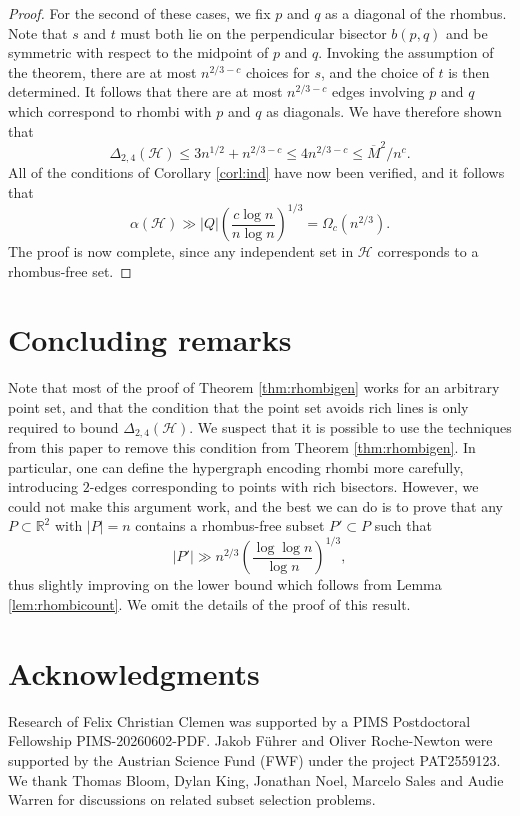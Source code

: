 \documentclass[11pt,oneside]{amsart}
\newcommand{\cH}{\mathcal{H}}
\numberwithin{exercise}{subsection}
\begin{document}
\begin{proof}
For the second of these cases, we fix $p$ and $q$ as a diagonal of the rhombus. Note that $s$ and $t$ must both lie on the perpendicular bisector $b(p,q)$ and be symmetric with respect to the midpoint of $p$ and $q$. Invoking the assumption of the theorem, there are at most $n^{2/3-c}$ choices for $s$, and the choice of $t$ is then determined. It follows that there are at most $n^{2/3-c}$ edges involving $p$ and $q$ which correspond to rhombi with $p$ and $q$ as diagonals. We have therefore shown that
\[
\Delta_{2,4}(\cH) \leq 3n^{1/2} + n^{2/3-c} \leq 4n^{2/3-c} \leq \overline M^2/n^c.
\]
All of the conditions of Corollary \ref{corl:ind} have now been verified, and it follows that
\[
\alpha(\cH) \gg |Q| \left(\frac{c  \log n}{n \log n} \right )^{1/3} = \Omega_c (n^{2/3}).
\]
The proof is now complete, since any independent set in $\cH$ corresponds to a rhombus-free set.
\end{proof}

\section{Concluding remarks}
Note that most of the proof of Theorem \ref{thm:rhombigen} works for an arbitrary point set, and that the condition that the point set avoids rich lines is only required to bound $\Delta_{2,4}(\cH)$. We suspect that it is possible to use the techniques from this paper to remove this condition from Theorem \ref{thm:rhombigen}. In particular, one can define the hypergraph encoding rhombi more carefully, introducing $2$-edges corresponding to points with rich bisectors. However, we could not make this argument work, and the best we can do is to prove that any $P \subset \mathbb R^2$ with $|P|=n$ contains a rhombus-free subset $P' \subset P$ such that
\[
|P'| \gg 
n^{2/3}\left(\frac{\log\log n}{\log n}\right)^{1/3},
\]
thus slightly improving on the lower bound which follows from Lemma \ref{lem:rhombicount}. We omit the details of the proof of this result.



\section{Acknowledgments}
Research of Felix Christian Clemen was supported by a PIMS Postdoctoral Fellowship PIMS-20260602-PDF. Jakob Führer and Oliver Roche-Newton were supported by the Austrian Science Fund (FWF) under the project PAT2559123. We thank Thomas Bloom, Dylan King, Jonathan Noel, Marcelo Sales and Audie Warren for discussions on related subset selection problems.


 

\end{document}
